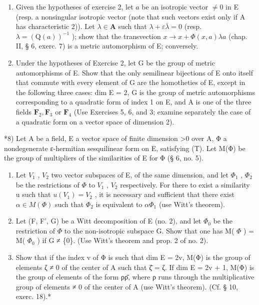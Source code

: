\begin{enumerate}
\def\labelenumi{\arabic{enumi})}
\setcounter{enumi}{5}
\item
  Given the hypotheses of exercise 2, let \(a\) be an isotropic vector \(\neq 0\) in E (resp. a nonsingular isotropic vector (note that such vectors exist only if A has characteristic 2)). Let \(\lambda \in \mathbf{A}\) such that \(\lambda + \varepsilon \bar{\lambda} = 0\) (resp. \(\lambda = (\mathrm{Q}(a))^{-1}\) ); show that the transvection \(x \to x + \Phi(x, a) \lambda a\) (chap. II, § 6, exerc. 7) is a metric automorphism of E; conversely.
\item
  Under the hypotheses of Exercise 2, let G be the group of metric automorphisms of E. Show that the only semilinear bijections of E onto itself that commute with every element of G are the homotheties of E, except in the following three cases: dim E = 2, G is the group of metric automorphisms corresponding to a quadratic form of index 1 on E, and A is one of the three fields \(\mathbf{F}_{2}, \mathbf{F}_{3}\) or \(\mathbf{F}_{4}\) (Use Exercises 5, 6, and 3; examine separately the case of a quadratic form on a vector space of dimension 2).
\end{enumerate}

*8) Let A be a field, E a vector space of finite dimension \textgreater0 over A, Φ a nondegenerate ε-hermitian sesquilinear form on E, satisfying (T). Let M(Φ) be the group of multipliers of the similarities of E for Φ (§ 6, no. 5).

\begin{enumerate}
\def\labelenumi{\alph{enumi})}
\item
  Let \(V_{1}\) , \(V_{2}\) two vector subspaces of E, of the same dimension, and let \(\Phi_{1}\) , \(\Phi_{2}\) be the restrictions of \(\Phi\) to \(V_{1}\) , \(V_{2}\) respectively. For there to exist a similarity u such that \(u(V_{1}) = V_{2}\) , it is necessary and sufficient that there exist \(\alpha \in M(\Phi)\) such that \(\Phi_{2}\) is equivalent to \(\alpha\Phi_{1}\) (use Witt's theorem).
\item
  Let (F, F', G) be a Witt decomposition of E (no. 2), and let \(\Phi_0\) be the restriction of \(\Phi\) to the non-isotropic subspace G. Show that one has M( \(\Phi\) ) = M( \(\Phi_0\) ) if G ≠ \{0\}. (Use Witt's theorem and prop. 2 of no. 2).
\item
  Show that if the index v of Φ is such that dim E = 2v, M(Φ) is the group of elements ζ ≠ 0 of the center of A such that ζ̄ = ζ. If dim E = 2v + 1, M(Φ) is the group of elements of the form ρρ̄, where ρ runs through the multiplicative group of elements ≠ 0 of the center of A (use Witt's theorem). (Cf. § 10, exerc. 18).*
\end{enumerate}

